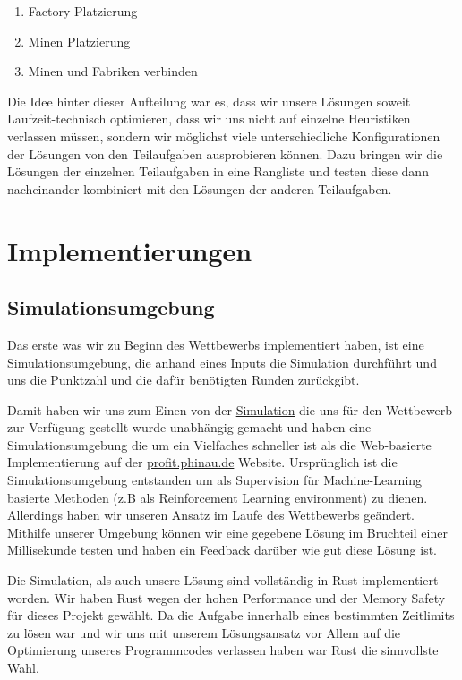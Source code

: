 \documentclass[12pt,a4paper]{article}
\begin{document}
\begin{enumerate}
    \item Factory Platzierung
    \item Minen Platzierung
    \item Minen und Fabriken verbinden
\end{enumerate}

Die Idee hinter dieser Aufteilung war es, dass wir unsere Lösungen soweit Laufzeit-technisch optimieren, dass wir uns nicht auf einzelne Heuristiken verlassen müssen, sondern wir möglichst viele unterschiedliche Konfigurationen der Lösungen von den Teilaufgaben ausprobieren können. Dazu bringen wir die Lösungen der einzelnen Teilaufgaben in eine Rangliste und testen diese dann nacheinander kombiniert mit den Lösungen der anderen Teilaufgaben.

\newpage

\section{Implementierungen}

\subsection{Simulationsumgebung}
Das erste was wir zu Beginn des Wettbewerbs implementiert haben, ist eine Simulationsumgebung, die anhand eines Inputs die Simulation durchführt und uns die Punktzahl und die dafür benötigten Runden zurückgibt.

Damit haben wir uns zum Einen von der \href{profit.phinau.de}{Simulation} die uns für den Wettbewerb zur Verfügung gestellt wurde unabhängig gemacht und haben eine Simulationsumgebung die um ein Vielfaches schneller ist als die Web-basierte Implementierung auf der \href{profit.phinau.de}{profit.phinau.de} Website. Ursprünglich ist die Simulationsumgebung entstanden um als Supervision für Machine-Learning basierte Methoden (z.B als Reinforcement Learning environment) zu dienen. Allerdings haben wir unseren Ansatz im Laufe des Wettbewerbs geändert. Mithilfe unserer Umgebung können wir eine gegebene Lösung im Bruchteil einer Millisekunde testen und haben ein Feedback darüber wie gut diese Lösung ist.

Die Simulation, als auch unsere Lösung sind vollständig in Rust implementiert worden. Wir haben Rust wegen der hohen Performance und der Memory Safety für dieses Projekt gewählt. Da die Aufgabe innerhalb eines bestimmten Zeitlimits zu lösen war und wir uns mit unserem Lösungsansatz vor Allem auf die Optimierung unseres Programmcodes verlassen haben war Rust die sinnvollste Wahl. 
\end{document}
